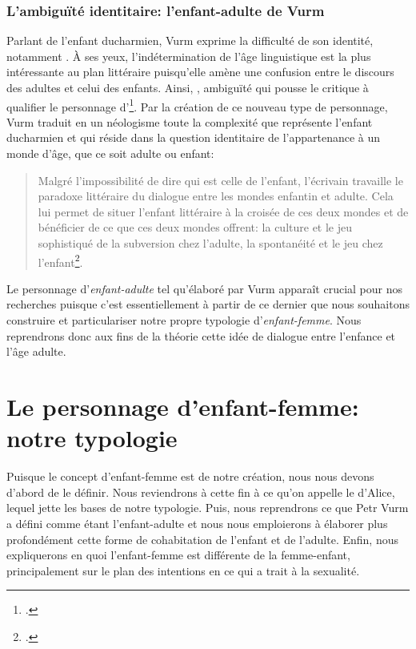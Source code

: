 \subsubsection{L'ambiguïté identitaire: l'enfant-adulte de Vurm}
Parlant de l'enfant ducharmien, Vurm exprime la difficulté de son identité, notamment .
À ses yeux, l'indétermination de l'âge linguistique est la plus intéressante au plan littéraire puisqu'elle amène une confusion entre le discours des adultes et celui des enfants.
Ainsi, , ambiguïté qui pousse le critique à qualifier le personnage d'\footcite[99-100]{Vurm2014}.
Par la création de ce nouveau type de personnage, Vurm traduit en un néologisme toute la complexité que représente l'enfant ducharmien et qui réside dans la question identitaire de l'appartenance à un monde d'âge, que ce soit adulte ou enfant:
\begin{quote}
  \begin{singlespace}
    \small
    Malgré l'impossibilité de dire qui est celle de l'enfant, l'écrivain travaille le paradoxe littéraire du dialogue entre les mondes enfantin et adulte. Cela lui permet de situer l'enfant littéraire à la croisée de ces deux mondes et de bénéficier de ce que ces deux mondes offrent: la culture et le jeu sophistiqué de la subversion chez l'adulte, la spontanéité et le jeu chez l'enfant\footcite[103]{Vurm2014}.
    \normalsize
  \end{singlespace}
\end{quote}
Le personnage d'\textit{enfant-adulte} tel qu'élaboré par Vurm apparaît crucial pour nos recherches puisque c'est essentiellement à partir de ce dernier que nous souhaitons construire et particulariser notre propre typologie d'\textit{enfant-femme}. Nous reprendrons donc aux fins de la théorie cette idée de dialogue entre l'enfance et l'âge adulte.

\section{Le personnage d'enfant-femme: notre typologie}
Puisque le concept d'enfant-femme est de notre création, nous nous devons d'abord de le définir.
Nous reviendrons à cette fin à ce qu'on appelle le  d'Alice, lequel jette les bases de notre typologie.
Puis, nous reprendrons ce que Petr Vurm a défini comme étant l'enfant-adulte et nous nous emploierons à élaborer plus profondément cette forme de cohabitation de l'enfant et de l'adulte.
Enfin, nous expliquerons en quoi l'enfant-femme est différente de la femme-enfant, principalement sur le plan des intentions en ce qui a trait à la sexualité.

